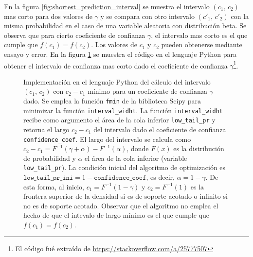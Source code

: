 \documentclass[a4paper]{report}
\begin{document}
En la figura \ref{fig:shortest_prediction_interval} se muestra el intervalo \((c_1,\,c_2)\) mas corto para dos valores de \(\gamma\) y se compara con otro intervalo \((c'_1,\,c'_2)\) con la misma probabilidad en el caso de una variable aleatoria con distribución beta. Se observa que para cierto coeficiente de confianza \(\gamma\), el intervalo mas corto es el que cumple que \(f(c_1)=f(c_2)\). Los valores de \(c_1\) y \(c_2\) pueden obtenerse mediante ensayo y error. En la figura \ref{fig:shortest_prediction_interval_code} se muestra el código en el lenguaje Python para obtener el intervalo de confianza mas corto dado el coeficiente de confianza \(\gamma\)\footnote{El código fué extraído de \url{https://stackoverflow.com/a/25777507}}.
\begin{figure}[!htb]
\begin{center}

\caption{\label{fig:shortest_prediction_interval_code} Implementación en el lenguaje Python del cálculo del intervalo \((c_1,\,c_2)\) con \(c_2-c_1\) mínimo para un coeficiente de confianza \(\gamma\) dado. Se emplea la función \texttt{fmin} de la biblioteca Scipy para minimizar la función \texttt{interval\_widht}. La función \texttt{interval\_widht} recibe como argumento el área de la cola inferior \texttt{low\_tail\_pr} y retorna el largo \(c_2-c_1\) del intervalo dado el coeficiente de confianza \texttt{confidence\_coef}. El largo del intervalo se calcula como \(c_2-c_1=F^{-1}(\gamma+\alpha)-F^{-1}(\alpha)\), donde \(F(x)\) es la distribución de probabilidad y \(\alpha\) el área de la cola inferior (variable \texttt{low\_tail\_pr}). La condición inicial del algoritmo de optimización es \(\texttt{low\_tail\_pr\_ini}=1-\texttt{confidence\_coef}\), es decir, \(\alpha=1-\gamma\). De esta forma, al inicio, \(c_1=F^{-1}(1-\gamma)\) y \(c_2=F^{-1}(1)\) es la frontera superior de la densidad si es de soporte acotado o infinito si no es de soporte acotado. Observar que el algoritmo no emplea el hecho de que el intevalo de largo mínimo es el que cumple que \(f(c_1)=f(c_2)\).}
\end{center}
\end{figure}                                                                                                                                                                                                                                                                                                                                                                                                                                                                                                                                                                                                                                                                                                                                                                                                                                                                                                                                                                                                                                                                                                                                                                           
\end{document}
